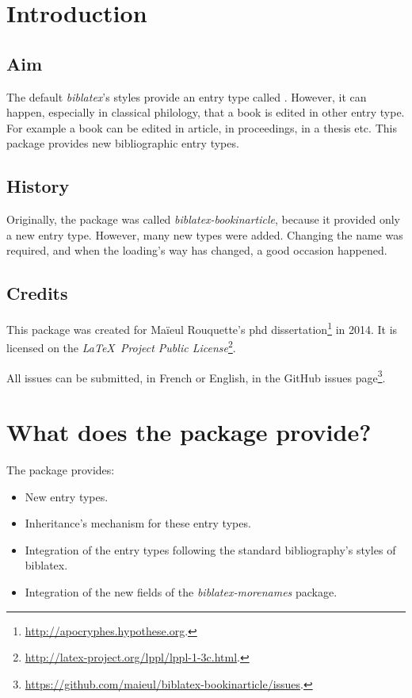 \documentclass{ltxdockit}[2011/03/25]
\newcommand{\pkg}[1]{\emph{#1}}
\newcommand{\biblatex}{\emph{biblatex}\xspace}
\begin{document}
\printtitlepage
\tableofcontents

\section{Introduction}

\subsection{Aim}
The default \biblatex's styles provide an entry type called . 
However, it can happen, especially in classical philology, that a book is edited in other entry type. 
For example a book can be edited in article, in proceedings, in a thesis etc.
This package provides new bibliographic entry types.

\subsection{History}

Originally, the package was called \pkg{biblatex-bookinarticle}, because it provided only a new  entry type. 
However, many new types were added. 
Changing the name was required, and when the loading's way has changed, a good occasion happened.
\subsection{Credits}

This package was created for Maïeul Rouquette's phd dissertation\footnote{\url{http://apocryphes.hypothese.org}.} in 2014. It is licensed on the \emph{\LaTeX\ Project Public License}\footnote{\url{http://latex-project.org/lppl/lppl-1-3c.html}.}. 


All issues can be submitted, in French or English, in the GitHub issues page\footnote{\url{https://github.com/maieul/biblatex-bookinarticle/issues}.}.


\section{What does the package provide?}

The package provides:
\begin{itemize}
  \item New entry types. 
  \item Inheritance's mechanism for these entry types. 
  \item Integration of the entry types following the standard bibliography's styles of biblatex. 
  \item Integration of the new fields of the \pkg{biblatex-morenames} package.
\end{itemize}
\end{document}
